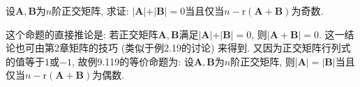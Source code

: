 \documentclass[../../main.tex]{subfiles}
\begin{document}
\begin{proposition}\label{proposition:两正交矩阵的和的秩与n的差为奇数则行列式和为0}
设\(\boldsymbol{A},\boldsymbol{B}\)为\(n\)阶正交矩阵, 求证: \(\vert\boldsymbol{A}\vert+\vert\boldsymbol{B}\vert = 0\)当且仅当\(n-\mathrm{r}(\boldsymbol{A}+\boldsymbol{B})\)为奇数.
\end{proposition}
\begin{remark}
这个命题的直接推论是: 若正交矩阵\(\boldsymbol{A},\boldsymbol{B}\)满足\(\vert\boldsymbol{A}\vert+\vert\boldsymbol{B}\vert = 0\), 则\(\vert\boldsymbol{A}+\boldsymbol{B}\vert = 0\). 这一结论也可由第2章矩阵的技巧 (类似于例2.19的讨论) 来得到. 又因为正交矩阵行列式的值等于\(1\)或\(-1\), 故例9.119的等价命题为: 设\(\boldsymbol{A},\boldsymbol{B}\)为\(n\)阶正交矩阵, 则\(\vert\boldsymbol{A}\vert = \vert\boldsymbol{B}\vert\)当且仅当\(n-\mathrm{r}(\boldsymbol{A}+\boldsymbol{B})\)为偶数.
\end{remark}
\end{document}
